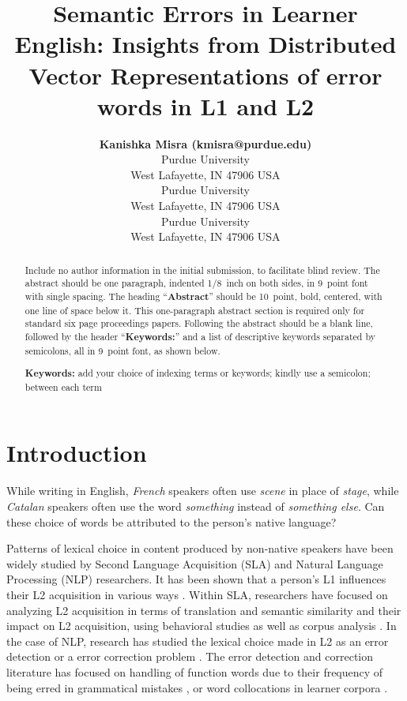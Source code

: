 \documentclass[10pt,letterpaper]{article}
\title{Semantic Errors in Learner English: Insights from Distributed Vector Representations of error words in L1 and L2}
\author{{\large \bf Kanishka Misra (kmisra@purdue.edu)} \\
  Purdue University \\
  West Lafayette, IN 47906 USA
  \AND {\large \bf Hemanth Devarapalli (hdevarap@purdue.edu)} \\
  Purdue University \\
  West Lafayette, IN 47906 USA
  \AND{\large \bf Julia Taylor Rayz (jtaylor1@purdue.edu)} \\
  Purdue University \\
  West Lafayette, IN 47906 USA}
\begin{document}
\maketitle


\begin{abstract}
Include no author information in the initial submission, to facilitate
blind review.  The abstract should be one paragraph, indented 1/8~inch on both sides,
in 9~point font with single spacing. The heading ``{\bf Abstract}''
should be 10~point, bold, centered, with one line of space below
it. This one-paragraph abstract section is required only for standard
six page proceedings papers. Following the abstract should be a blank
line, followed by the header ``{\bf Keywords:}'' and a list of
descriptive keywords separated by semicolons, all in 9~point font, as
shown below.

\textbf{Keywords:} 
add your choice of indexing terms or keywords; kindly use a
semicolon; between each term
\end{abstract}


\section{Introduction}

While writing in English, \textit{French} speakers often use \textit{scene} in place of \textit{stage}, while \textit{Catalan} speakers often use the word \textit{something} instead of \textit{something else}. Can these choice of words be attributed to the person's native language?

Patterns of lexical choice in content produced by non-native speakers have been widely studied by Second Language Acquisition (SLA) and Natural Language Processing (NLP) researchers. It has been shown that a person's L1 influences their L2 acquisition in various ways . Within SLA, researchers have focused on analyzing L2 acquisition in terms of translation and semantic similarity and their impact on L2 acquisition, using behavioral studies  as well as corpus analysis . In the case of NLP, research has studied the lexical choice made in L2 as an error detection or a error correction problem . The error detection and correction literature has focused on handling of function words due to their frequency of being erred in grammatical mistakes , or word collocations in learner corpora . 
\end{document}
